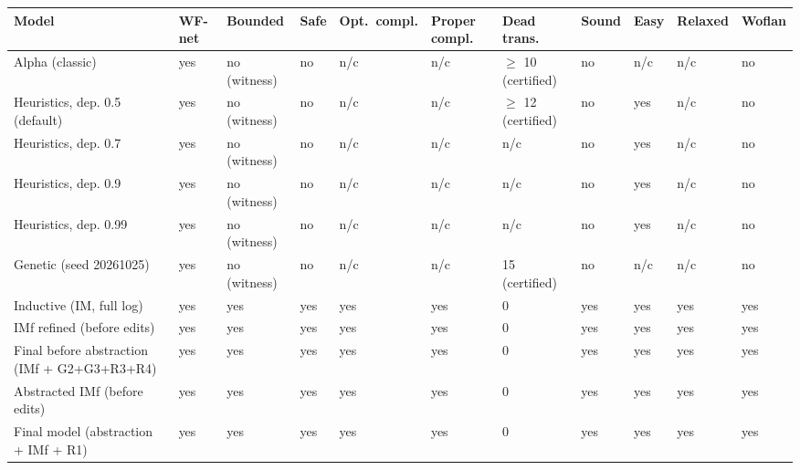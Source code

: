 \begin{tabular}{lllllllllll}
\hline
Model & WF-net & Bounded & Safe & Opt.\ compl. & Proper compl. & Dead trans. & Sound & Easy & Relaxed & Woflan \\
\hline
Alpha (classic) & yes & no (witness) & no & n/c & n/c & $\geq$ 10 (certified) & no & n/c & n/c & no \\
Heuristics, dep. 0.5 (default) & yes & no (witness) & no & n/c & n/c & $\geq$ 12 (certified) & no & yes & n/c & no \\
Heuristics, dep. 0.7 & yes & no (witness) & no & n/c & n/c & n/c & no & yes & n/c & no \\
Heuristics, dep. 0.9 & yes & no (witness) & no & n/c & n/c & n/c & no & yes & n/c & no \\
Heuristics, dep. 0.99 & yes & no (witness) & no & n/c & n/c & n/c & no & yes & n/c & no \\
Genetic (seed 20261025) & yes & no (witness) & no & n/c & n/c & 15 (certified) & no & n/c & n/c & no \\
Inductive (IM, full log) & yes & yes & yes & yes & yes & 0 & yes & yes & yes & yes \\
IMf refined (before edits) & yes & yes & yes & yes & yes & 0 & yes & yes & yes & yes \\
Final before abstraction (IMf + G2+G3+R3+R4) & yes & yes & yes & yes & yes & 0 & yes & yes & yes & yes \\
Abstracted IMf (before edits) & yes & yes & yes & yes & yes & 0 & yes & yes & yes & yes \\
Final model (abstraction + IMf + R1) & yes & yes & yes & yes & yes & 0 & yes & yes & yes & yes \\
\hline
\end{tabular}
